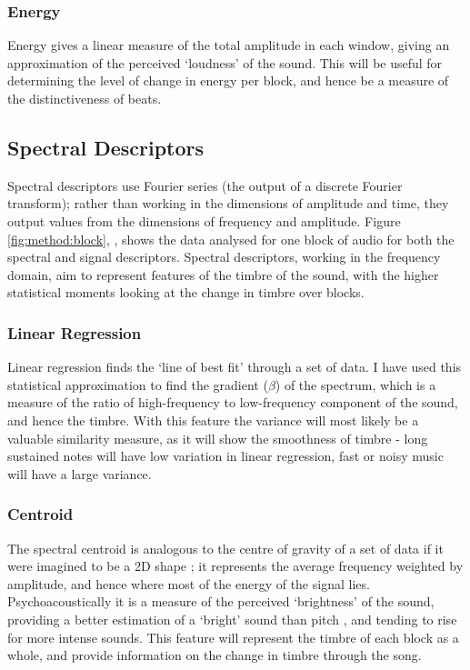\subsubsection{Energy}

Energy gives a linear measure of the total amplitude in each window, giving an approximation of the perceived `loudness' of the sound. This will be useful for determining the level of change in energy per block, and hence be a measure of the distinctiveness of beats.
\subsection{Spectral Descriptors}
Spectral descriptors use Fourier series (the output of a discrete Fourier transform); rather than working in the dimensions of amplitude and time, they output values from the dimensions of frequency and amplitude. Figure \ref{fig:method:block}, , shows the data analysed for one block of audio for both the spectral and signal descriptors. Spectral descriptors, working in the frequency domain, aim to represent features of the timbre of the sound, with the higher statistical moments looking at the change in timbre over blocks.
\subsubsection{Linear Regression}

Linear regression finds the `line of best fit' through a set of data. I have used this statistical approximation to find the gradient ($\beta$) of the spectrum, which is a measure of the ratio of high-frequency to low-frequency component of the sound, and hence the timbre. With this feature the variance will most likely be a valuable similarity measure, as it will show the smoothness of timbre - long sustained notes will have low variation in linear regression, fast or noisy music will have a large variance.
\subsubsection{Centroid}

The spectral centroid is analogous to the centre of gravity of a set of data if it were imagined to be a 2D shape \citep{Park2004}; it represents the average frequency weighted by amplitude, and hence where most of the energy of the signal lies. Psychoacoustically it is a measure of the perceived `brightness' of the sound, providing a better estimation of a `bright' sound than pitch \citep{Schubert2004}, and tending to rise for more intense sounds. This feature will represent the timbre of each block as a whole, and provide information on the change in timbre through the song.
